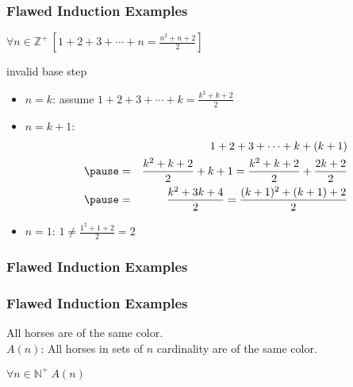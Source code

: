 \documentclass[dvipsnames]{beamer}
\begin{document}
\begin{frame}
  \frametitle{Flawed Induction Examples}

  \begin{theorem}
    $\forall n \in \mathbb{Z}^+~[1+2+3+\cdots+n=\frac{n^2+n+2}{2}]$
  \end{theorem}

  \pause
  \begin{block}{invalid base step}
    \begin{itemize}
      \item $n=k$: assume $1+2+3+\cdots+k=\frac{k^2+k+2}{2}$

      \pause
      \item $n=k+1$:
      \begin{eqnarray*}
        &   & 1+2+3+\cdots+k+(k+1)\\\pause
        & = & \frac{k^2+k+2}{2}+k+1
          =   \frac{k^2+k+2}{2}+\frac{2k+2}{2}\\\pause
        & = & \frac{k^2+3k+4}{2}
          =   \frac{(k+1)^2+(k+1)+2}{2}
      \end{eqnarray*}

      \pause
      \item $n=1$: $1 \neq \frac{1^2+1+2}{2}=2$
    \end{itemize}
  \end{block}
\end{frame}

\begin{frame}
  \frametitle{Flawed Induction Examples}

  \begin{center}
  \end{center}
\end{frame}

\begin{frame}
  \frametitle{Flawed Induction Examples}

  \begin{theorem}
    All horses are of the same color.\\
    \pause
    \bigskip
    $A(n)$: All horses in sets of $n$ cardinality are of the same color.

    \medskip
    $\forall n \in \mathbb{N^+}~A(n)$
  \end{theorem}
\end{frame}
\end{document}
